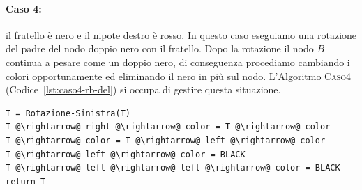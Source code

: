 \paragraph{Caso 4:} il fratello è nero e il nipote destro è rosso. In questo caso eseguiamo una rotazione del padre del nodo doppio nero con il fratello. Dopo la rotazione il nodo $B$ continua a pesare come un doppio nero, di conseguenza procediamo cambiando i colori opportunamente ed eliminando il nero in più sul nodo. L'Algoritmo \textsc{Caso4} (Codice~\ref{lst:caso4-rb-del}) si occupa di gestire questa situazione.
\begin{lstlisting}[language=asd,caption={Caso4(T)},label=lst:caso4-rb-del]
T = Rotazione-Sinistra(T)
T @\rightarrow@ right @\rightarrow@ color = T @\rightarrow@ color
T @\rightarrow@ color = T @\rightarrow@ left @\rightarrow@ color
T @\rightarrow@ left @\rightarrow@ color = BLACK
T @\rightarrow@ left @\rightarrow@ left @\rightarrow@ color = BLACK
return T
\end{lstlisting}
